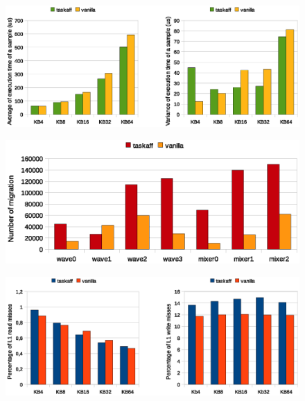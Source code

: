 \begin{figure}[htbp]
\centering
\includegraphics[width=\widefigure]{images/results_xeon/time_avg_var.eps}
\caption{}
\label{fig:time_avg_var_xeon}
\end{figure}

\begin{figure}[htbp]
\centering
\includegraphics[width=\widefigure]{images/results_xeon/migration_xeon.eps}
\caption{}
\label{fig:migration_xeon}
\end{figure}

\begin{figure}[htbp]
\centering
\includegraphics[width=\widefigure]{images/results_xeon/l1_load_store_xeon.eps}
\caption{}
\label{fig:l1_load_store_xeon}
\end{figure}

